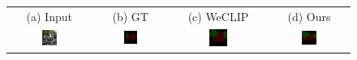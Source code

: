 \begin{figure}[ht]
  \centering
  \setlength{\tabcolsep}{2pt} %
  \renewcommand{\arraystretch}{0.9}
  \begin{tcolorbox}[colframe=black!60, colback=white, boxrule=0.8pt, arc=2pt, left=2pt, right=2pt, top=2pt, bottom=2pt]
    \centering
    \begin{tabular}{cccc}
      (a) Input & (b) GT & (c) WeCLIP & (d) Ours           \\
      [1mm]

      \includegraphics[width=0.20\textwidth,height=0.20\textwidth]
      {figures/originals/2007_003778}
                &
      \includegraphics[width=0.20\textwidth,height=0.20\textwidth]
      {figures/colored_gts/2007_003778}
                &
      \includegraphics[width=0.20\textwidth,height=0.20\textwidth]
      {figures/val_labels/weclip/2007_003778_[7, 15]}
                &
      \includegraphics[width=0.20\textwidth,height=0.20\textwidth]
      {figures/val_labels/ours/2007_003778_[7, 15]}    \\


\end{tabular}
\end{tcolorbox}
\end{figure}
